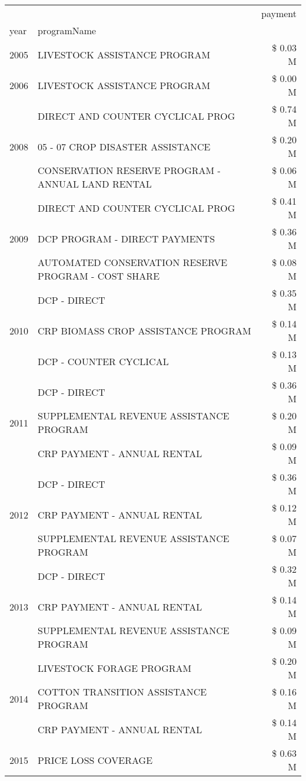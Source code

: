 \begin{tabular}{llr}
\toprule
 &  & payment \\
year & programName &  \\
\midrule
2005 & LIVESTOCK ASSISTANCE PROGRAM & \$ 0.03 M \\
\cline{1-3}
2006 & LIVESTOCK ASSISTANCE PROGRAM & \$ 0.00 M \\
\cline{1-3}
\multirow[t]{3}{*}{2008} & DIRECT AND COUNTER CYCLICAL PROG & \$ 0.74 M \\
 & 05 - 07 CROP DISASTER ASSISTANCE & \$ 0.20 M \\
 & CONSERVATION RESERVE PROGRAM - ANNUAL LAND RENTAL & \$ 0.06 M \\
\cline{1-3}
\multirow[t]{3}{*}{2009} & DIRECT AND COUNTER CYCLICAL PROG & \$ 0.41 M \\
 & DCP PROGRAM - DIRECT PAYMENTS & \$ 0.36 M \\
 & AUTOMATED CONSERVATION RESERVE PROGRAM - COST SHARE & \$ 0.08 M \\
\cline{1-3}
\multirow[t]{3}{*}{2010} & DCP - DIRECT & \$ 0.35 M \\
 & CRP BIOMASS CROP ASSISTANCE PROGRAM & \$ 0.14 M \\
 & DCP - COUNTER CYCLICAL & \$ 0.13 M \\
\cline{1-3}
\multirow[t]{3}{*}{2011} & DCP - DIRECT & \$ 0.36 M \\
 & SUPPLEMENTAL REVENUE ASSISTANCE PROGRAM & \$ 0.20 M \\
 & CRP PAYMENT - ANNUAL RENTAL & \$ 0.09 M \\
\cline{1-3}
\multirow[t]{3}{*}{2012} & DCP - DIRECT & \$ 0.36 M \\
 & CRP PAYMENT - ANNUAL RENTAL & \$ 0.12 M \\
 & SUPPLEMENTAL REVENUE ASSISTANCE PROGRAM & \$ 0.07 M \\
\cline{1-3}
\multirow[t]{3}{*}{2013} & DCP - DIRECT & \$ 0.32 M \\
 & CRP PAYMENT - ANNUAL RENTAL & \$ 0.14 M \\
 & SUPPLEMENTAL REVENUE ASSISTANCE PROGRAM & \$ 0.09 M \\
\cline{1-3}
\multirow[t]{3}{*}{2014} & LIVESTOCK FORAGE PROGRAM & \$ 0.20 M \\
 & COTTON TRANSITION ASSISTANCE PROGRAM & \$ 0.16 M \\
 & CRP PAYMENT - ANNUAL RENTAL & \$ 0.14 M \\
\cline{1-3}
\multirow[t]{3}{*}{2015} & PRICE LOSS COVERAGE & \$ 0.63 M \\

\end{tabular}
